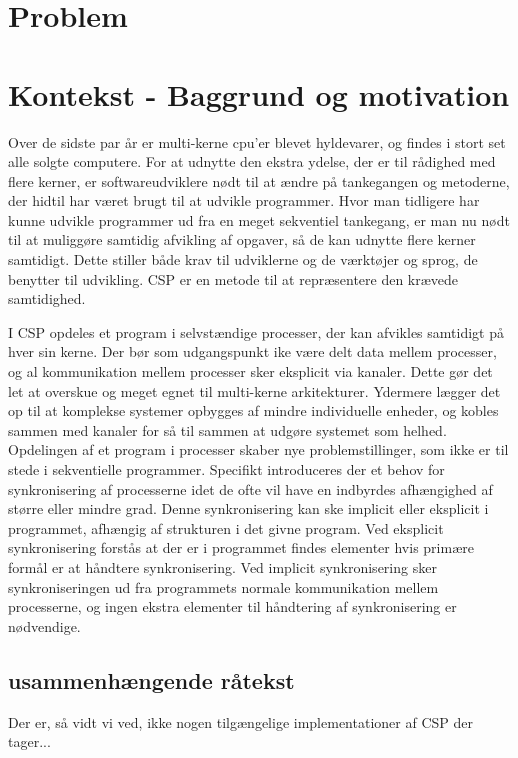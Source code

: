   \section{Problem}	 
  \section{Kontekst - Baggrund og motivation}
Over de sidste par år er multi-kerne cpu'er blevet hyldevarer, og findes i 
stort set alle solgte computere. For at udnytte den ekstra 
ydelse, der er til rådighed med flere kerner, er softwareudviklere nødt til at 
ændre på tankegangen og metoderne, der hidtil har været brugt til at udvikle 
programmer. Hvor man tidligere har kunne udvikle programmer ud fra en meget 
sekventiel tankegang, er man nu nødt til at muliggøre samtidig afvikling af 
opgaver, så de kan udnytte flere kerner samtidigt. Dette stiller både krav 
til udviklerne og de værktøjer og sprog, de benytter til udvikling. CSP er en metode 
til at repræsentere den krævede samtidighed\cite{hoare-csp}. 
\begin{shaded}
I CSP opdeles et program i selvstændige processer, der 
kan afvikles samtidigt på hver sin kerne. Der bør som udgangspunkt ike være 
delt data mellem processer, og al kommunikation mellem processer sker eksplicit 
via kanaler. Dette gør det let at overskue og meget egnet til multi-kerne 
arkitekturer. Ydermere lægger det op til at komplekse systemer opbygges af 
mindre individuelle enheder, og kobles sammen med kanaler for så til sammen at 
udgøre systemet som helhed.
Opdelingen af et program i processer skaber nye problemstillinger, som ikke er 
til stede i sekventielle programmer. Specifikt introduceres der et behov for 
synkronisering af processerne idet de ofte vil have en indbyrdes afhængighed af 
større eller mindre grad. Denne synkronisering kan ske implicit eller eksplicit 
i programmet, afhængig af strukturen i det givne program. Ved eksplicit 
synkronisering forstås at der er i programmet findes elementer hvis primære 
formål er at håndtere synkronisering. Ved implicit synkronisering sker 
synkroniseringen ud fra programmets normale kommunikation mellem processerne, 
og ingen ekstra elementer til håndtering af synkronisering er nødvendige.  
\end{shaded}
\subsection{usammenhængende råtekst}
Der er, så vidt vi ved, ikke nogen tilgængelige implementationer af CSP der 
tager... 


